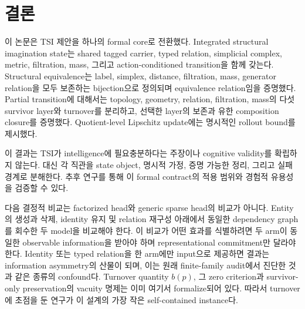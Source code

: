 \section{결론}

이 논문은 TSI 제안을 하나의 formal core로 전환했다. Integrated structural imagination state는 shared tagged carrier, typed relation, simplicial complex, metric, filtration, mass, 그리고 action-conditioned transition을 함께 갖는다. Structural equivalence는 label, simplex, distance, filtration, mass, generator relation을 모두 보존하는 bijection으로 정의되며 equivalence relation임을 증명했다. Partial transition에 대해서는 topology, geometry, relation, filtration, mass의 다섯 survivor layer와 turnover를 분리하고, 선택한 layer의 보존과 유한 composition closure를 증명했다. Quotient-level Lipschitz update에는 명시적인 rollout bound를 제시했다.

이 결과는 TSI가 intelligence에 필요충분하다는 주장이나 cognitive validity를 확립하지 않는다. 대신 각 직관을 state object, 명시적 가정, 증명 가능한 정리, 그리고 실패 경계로 분해한다. 추후 연구를 통해 이 formal contract의 적용 범위와 경험적 유용성을 검증할 수 있다.

다음 결정적 비교는 factorized head와 generic sparse head의 비교가 아니다. Entity의
생성과 삭제, identity 유지 및 relation 재구성 아래에서 동일한 dependency graph를
회수한 두 model을 비교해야 한다. 이 비교가 어떤 효과를 식별하려면 두 arm이 동일한
observable information을 받아야 하며 representational commitment만 달라야 한다.
Identity 또는 typed relation을 한 arm에만 input으로 제공하면 결과는 information
asymmetry의 산물이 되며, 이는 원래 finite-family audit에서 진단한 것과 같은 종류의
confound다. Turnover quantity \(b(p)\), 그 zero criterion과 survivor-only preservation의
vacuity 명제는 이미 여기서 formalize되어 있다. 따라서 turnover에 초점을 둔 연구가 이
설계의 가장 작은 self-contained instance다.
